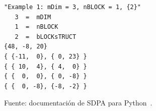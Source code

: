 \begin{table}[H]
\centering
\caption{Representación densa del ejemplo en formato SDPA.}
\label{tab:sdpa_format_example}
\begin{minipage}{0.72\textwidth}
\begin{verbatim}
"Example 1: mDim = 3, nBLOCK = 1, {2}"
   3  =  mDIM
   1  =  nBLOCK
   2  =  bLOCKsTRUCT
{48, -8, 20}
{ {-11,  0}, { 0, 23} }
{ { 10,  4}, { 4,  0} }
{ {  0,  0}, { 0, -8} }
{ {  0, -8}, {-8, -2} }
\end{verbatim}
\end{minipage}

\vspace{0.15cm}
{\footnotesize Fuente: documentación de SDPA para Python~\parencite{SDPAFormat}.}
\end{table}
